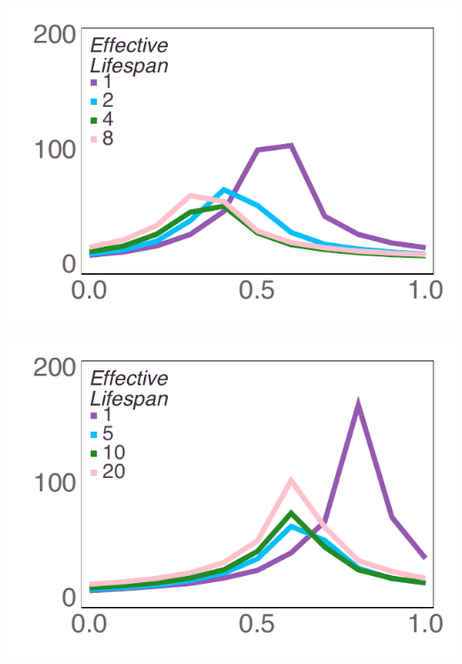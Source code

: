 \documentclass[varwidth=true,crop=false]{standalone}
\begin{document}
	\begin{minipage}{3.75in}%
      \includegraphics[width=\textwidth]{Figures/step_over_u_lowpayoff=0.1_nbehaviors=4.pdf}
    \end{minipage}\noindent
	\begin{minipage}{3.75in}%
      \includegraphics[width=\textwidth]{Figures/step_over_u_lowpayoff=0.1_nbehaviors=10.pdf}
    \end{minipage}~\\[4.0em]
\end{document}
